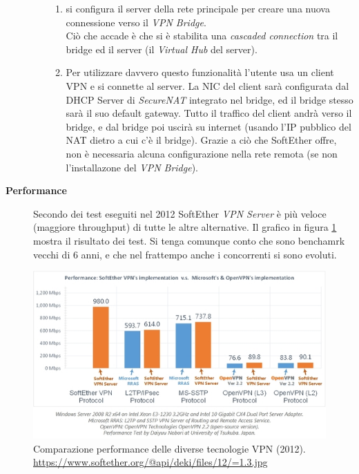 \begin{description}
\begin{itemize}
\begin{enumerate}
      \item si configura il server della rete principale per creare una nuova connessione verso il \textit{VPN Bridge}.\\
      Ciò che accade è che si è stabilita una \textit{cascaded connection} tra il bridge ed il server (il \textit{Virtual Hub}
      del server).
      \item Per utilizzare davvero questo funzionalità l'utente usa un client VPN e si connette al server. La NIC
      del client sarà configurata dal DHCP Server di \textit{SecureNAT} integrato nel bridge,
      ed il bridge stesso sarà il suo default gateway. Tutto il traffico del client andrà verso il bridge, e dal bridge poi
      uscirà su internet (usando l'IP pubblico del NAT dietro a cui c'è il bridge). Grazie a ciò che SoftEther offre,
      non è necessaria alcuna configurazione nella rete remota (se non l'installazone del \textit{VPN Bridge}).
    \end{enumerate}
  \end{itemize}
  \item[\textbf{Performance}]Secondo dei test eseguiti nel 2012 SoftEther \textit{VPN Server} è più veloce (maggiore throughput) di tutte le
  altre alternative. Il grafico in figura \ref{fig:softether-performance} mostra il risultato dei test. Si tenga comunque
  conto che sono benchamrk vecchi di 6 anni, e che nel frattempo anche i concorrenti si sono evoluti.
\end{description}
\begin{figure}
  \includegraphics[scale=0.4]{img/softether_perf}
  \caption[Comparazione performance delle diverse tecnologie VPN]{
    Comparazione performance delle diverse tecnologie VPN (2012).
    \url{https://www.softether.org/@api/deki/files/12/=1.3.jpg}}
  \label{fig:softether-performance}
\end{figure}

